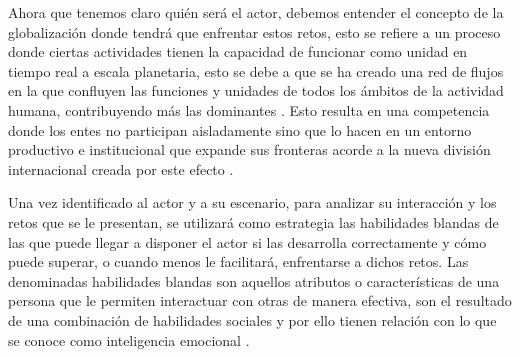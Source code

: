 \noindent Ahora que tenemos claro quién será el actor, debemos entender el concepto de la globalización donde tendrá que enfrentar estos retos, esto se refiere a un proceso donde ciertas actividades tienen la capacidad de funcionar como unidad en tiempo real a escala planetaria, esto se debe a que se ha creado una red de flujos en la que confluyen las funciones y unidades de todos los ámbitos de la actividad humana, contribuyendo más las dominantes \cite{pnud:1999}. Esto resulta en una competencia donde los entes no participan aisladamente sino que lo hacen en un entorno productivo e institucional que expande sus fronteras acorde a la nueva división internacional creada por este efecto \cite{vban:2000}.
\vspace{5mm}

\noindent Una vez identificado al actor y a su escenario, para analizar su interacción y los retos que se le presentan, se utilizará como estrategia las habilidades blandas de las que puede llegar a disponer el actor si las desarrolla correctamente y cómo puede superar, o cuando menos le facilitará, enfrentarse a dichos retos. Las denominadas habilidades blandas son aquellos atributos o características de una persona que le permiten interactuar con otras de manera efectiva, son el resultado de una combinación de habilidades sociales y por ello tienen relación con lo que se conoce como inteligencia emocional \cite{jml:2019}.
